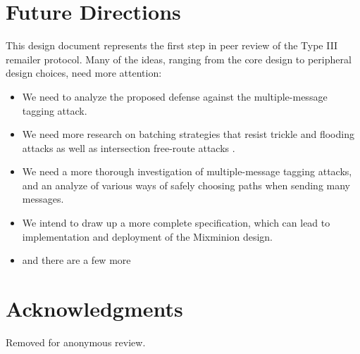 \documentclass{llncs}
\begin{document}

\section{Future Directions}
\label{sec:conclusion}

This design document represents the first step in peer review of the
Type III remailer protocol. Many of the ideas, ranging from the core
design to peripheral design choices, need more attention:

\begin{itemize}
\item We need to analyze the proposed defense against the multiple-message
tagging attack.
\item We need more research on batching strategies that resist trickle
and flooding attacks \cite{batching-taxonomy} as well as intersection
free-route attacks \cite{disad-free-routes}.
\item We need a more thorough investigation of multiple-message tagging
attacks, and an analyze of various ways of safely choosing paths when
sending many messages.
\item We intend to draw up a more complete specification, which can lead
to implementation and deployment of the Mixminion design.
\item and there are a few more
\end{itemize}




\section*{Acknowledgments} Removed for anonymous review.





\end{document}
